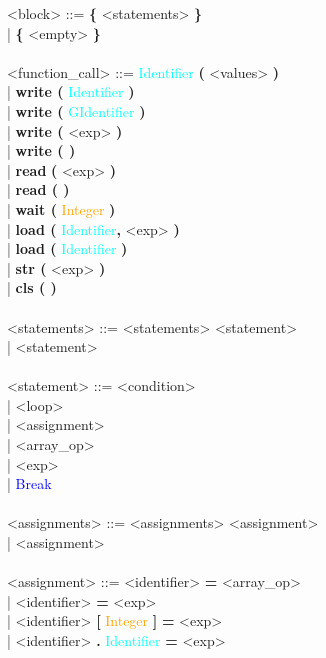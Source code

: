 \documentclass{Dokumentmall}
\begin{document}
\begin{tabbing}
  \><block> \>::= \>\textbf{\{} <statements> \textbf{\}}\\
  \> \>| \> \textbf{\{} <empty> \textbf{\}}\\\\

  \><function\_call> \>::= \>\textcolor{Cyan}{Identifier} \textbf{(} <values> \textbf{)}\\
  \> \>| \> \textbf{write (} \textcolor{Cyan}{Identifier} \textbf{)}\\
  \> \>| \> \textbf{write (} \textcolor{Cyan}{GIdentifier} \textbf{)}\\
  \> \>| \> \textbf{write (} <exp> \textbf{)}\\
  \> \>| \> \textbf{write ( )}\\
  \> \>| \> \textbf{read} \textbf{(} <exp> \textbf{)}\\
  \> \>| \> \textbf{read ( )}\\
  \> \>| \> \textbf{wait (} \textcolor{orange}{Integer} \textbf{)}\\
  \> \>| \> \textbf{load (} \textcolor{Cyan}{Identifier}\textbf{,} <exp> \textbf{)}\\
  \> \>| \> \textbf{load (} \textcolor{Cyan}{Identifier} \textbf{)}\\
  \> \>| \> \textbf{str (} <exp> \textbf{)}\\
  \> \>| \> \textbf{cls ( )}\\\\


  \><statements> \>::= \><statements> <statement>\\
  \> \>| \> <statement>\\\\

  \><statement> \>::= \><condition>\\
  \> \>| \> <loop>\\
  \> \>| \> <assignment>\\
  \> \>| \> <array\_op>\\
  \> \>| \> <exp>\\
  \> \>| \> \textcolor{blue}{Break}\\\\

  \><assignments> \>::= \><assignments> <assignment>\\
  \> \>| \> <assignment>\\\\

  \><assignment> \>::= \><identifier> \textbf{=} <array\_op>\\
  \> \>| \> <identifier> \textbf{=} <exp>\\
  \> \>| \> <identifier> \textbf{[} \textcolor{orange}{Integer} \textbf{]} \textbf{=} <exp>\\
  \> \>| \> <identifier> \textbf{.} \textcolor{Cyan}{Identifier}  \textbf{=} <exp>\\\\


\end{tabbing}
\end{document}
